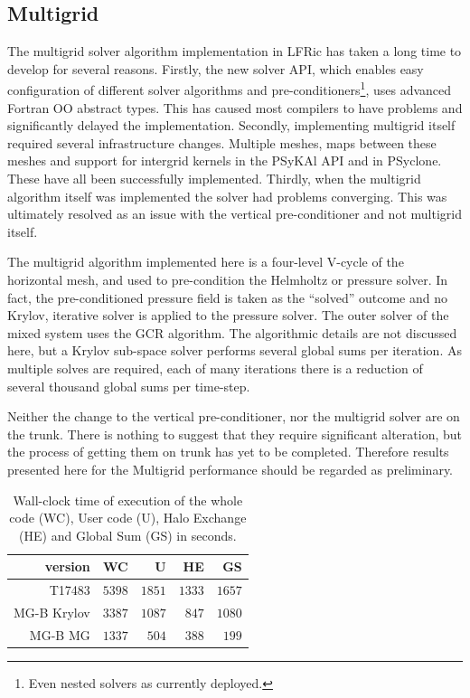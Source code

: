 \subsection{\label{sec:multigrid}Multigrid}
The multigrid solver algorithm implementation in LFRic has taken a
long time to develop for several reasons. Firstly, the new solver API,
which enables easy configuration of different solver algorithms and
pre-conditioners\footnote{Even nested solvers as currently deployed.},
uses advanced Fortran OO abstract types. This has caused most
compilers to have problems and significantly delayed the
implementation. Secondly, implementing multigrid itself required
several infrastructure changes. Multiple meshes, maps between these
meshes and support for intergrid kernels in the PSyKAl API and in
PSyclone. These have all been successfully implemented. Thirdly, when
the multigrid algorithm itself was implemented the solver had problems
converging.
This was ultimately resolved as an issue with the vertical
pre-conditioner and not multigrid itself. 

The multigrid algorithm implemented here is a four-level V-cycle of
the horizontal mesh, and used to pre-condition the Helmholtz or
pressure solver. In fact, the pre-conditioned pressure field is taken
as the ``solved'' outcome and no Krylov, iterative solver is applied
to the pressure solver. The outer solver of the mixed system uses the
GCR algorithm. The algorithmic details are not discussed here, but a
Krylov sub-space solver performs several global sums per iteration. As
multiple solves are required, each of many iterations there is a
reduction of several thousand global sums per time-step.

Neither the change to the vertical pre-conditioner, nor the multigrid
solver are on the trunk. There is nothing to suggest that they require
significant alteration, but the process of getting them on trunk has
yet to be completed. Therefore results presented here for the
Multigrid performance should be regarded as preliminary.

\begin{table}
\centering
\caption{\label{tab:MG_data}Wall-clock time of execution of the whole code (WC), User
  code (U), Halo Exchange (HE) and Global Sum (GS) in seconds. }
\begin{tabular}{r|rrrr}
version     & WC     & U      & HE     & GS \\\hline
T17483      & $5398$ & $1851$ & $1333$ & $1657$ \\
MG-B Krylov & $3387$ & $1087$ & $847$  & $1080$ \\
MG-B MG     & $1337$ & $504$  & $388$  & $199$ \\\hline
\end{tabular}
\end{table}

